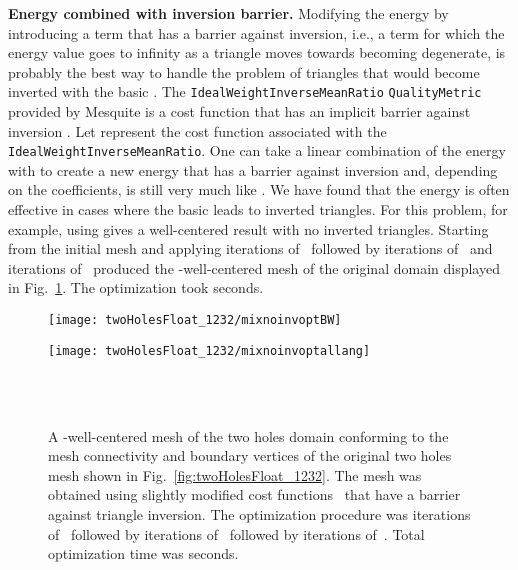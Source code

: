 \documentclass[final]{siamltex}
\begin{document}
{\bf{Energy combined with inversion barrier.}}  Modifying the energy
by introducing a term that has a barrier against inversion, i.e., a
term for which the energy value goes to infinity as a triangle moves
towards becoming degenerate, is probably the best way to handle the
problem of triangles that would become inverted with the basic .
The {\texttt{IdealWeightInverseMeanRatio}} {\texttt{QualityMetric}}
provided by Mesquite is a cost function that has an implicit barrier
against inversion \cite{Munson2007}.  Let  represent
the cost function associated with the
{\texttt{IdealWeightInverseMeanRatio}}.  One can take a linear
combination of the energy  with  to
create a new energy that has a barrier against inversion and,
depending on the coefficients, is still very much like .
We have found that the energy
 is often
effective in cases where the basic  leads to inverted
triangles.  For this problem, for example, using 
gives a well-centered result with no inverted triangles.  
Starting from the initial mesh and applying  iterations
of~ followed by  iterations
of~ and  iterations of~
produced the -well-centered mesh of the original domain displayed
in Fig.~\ref{fig:twoHolesFloat_1232_wct}.  The optimization took
 seconds.

\begin{figure}
  \centering
  \begin{minipage}[c]{135pt}
    \texttt{[image: twoHolesFloat\_1232/mixnoinvoptBW]}\end{minipage}\hspace{20pt}\begin{minipage}[c]{90pt}
    \texttt{[image: twoHolesFloat\_1232/mixnoinvoptallang]}\end{minipage}\hspace{5pt}
  \begin{minipage}[c]{50pt}
    \centering
    {\small \\
    \\
    }
  \end{minipage}
  \caption{A -well-centered mesh of the two holes domain conforming
    to the mesh connectivity and boundary vertices of the original two
    holes mesh shown in Fig.~\ref{fig:twoHolesFloat_1232}.  The mesh
    was obtained using slightly modified cost
    functions~ that have a barrier against triangle
    inversion.  The optimization procedure was  iterations
    of~ followed by  iterations
    of~ followed by  iterations
    of~.  Total optimization time was 
    seconds.}
  \label{fig:twoHolesFloat_1232_wct}
\end{figure}
\end{document}
